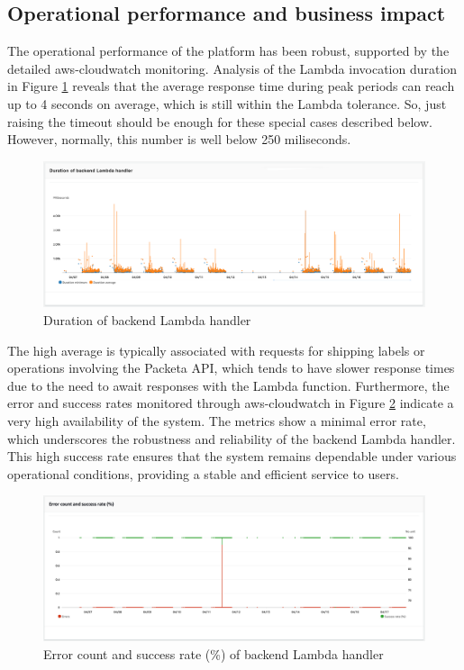 \subsection{Operational performance and business impact}
\label{subsec:operational-performance-business-impact}
The operational performance of the platform has been robust, supported by the detailed \gls{aws-cloudwatch} monitoring.
Analysis of the Lambda invocation duration in Figure \ref{img08:plot:lambda_handler_durations} reveals that the average response time during peak periods can reach up to 4 seconds on average, which is still within the Lambda tolerance.
So, just raising the timeout should be enough for these special cases described below.
However, normally, this number is well below 250 miliseconds.
\begin{figure}[H]\centering
\includegraphics[width=140mm]{img/chap08/lambda_handler_durations.png}
\caption{Duration of backend Lambda handler}
\label{img08:plot:lambda_handler_durations}
\end{figure}
The high average is typically associated with requests for shipping labels or operations involving the Packeta API, which tends to have slower response times due to the need to await responses with the Lambda function.
Furthermore, the error and success rates monitored through \gls{aws-cloudwatch} in Figure \ref{img08:plot:lambda_handler_errors} indicate a very high availability of the system. The metrics show a minimal error rate, which underscores the robustness and reliability of the backend Lambda handler. This high success rate ensures that the system remains dependable under various operational conditions, providing a stable and efficient service to users.
\begin{figure}[H]\centering
\includegraphics[width=140mm]{img/chap08/lambda_handler_errors.png}
\caption{Error count and success rate (\%) of backend Lambda handler}
\label{img08:plot:lambda_handler_errors}
\end{figure}

